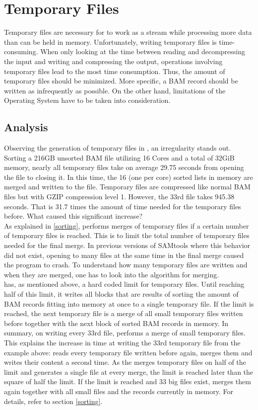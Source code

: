 \section{Temporary Files} 

Temporary files are necessary for \sort to work as a stream while processing more data than can be held in memory. Unfortunately, writing temporary files is time-consuming. When only looking at the time between reading and decompressing the input and writing and compressing the output, operations involving temporary files lead to the most time consumption. Thus, the amount of temporary files should be minimized. More specific, a BAM record should be written as infrequently as possible. On the other hand, limitations of the Operating System have to be taken into consideration.

\subsection{Analysis}
Observing the generation of temporary files in \sort, an irregularity stands out. Sorting a 216GB unsorted BAM file utilizing 16 Cores and a total of 32GiB memory, nearly all temporary files take on average 29.75 seconds from opening the file to closing it. In this time, the 16 (one per core) sorted lists in memory are merged and written to the file. Temporary files are compressed like normal BAM files but with GZIP compression level 1. However, the 33rd file takes 945.38 seconds. That is 31.7 times the amount of time needed for the temporary files before. What caused this significant increase? \\
As explained in \ref{sorting}, \sort performs merges of temporary files if a certain number of temporary files is reached. This is to limit the total number of temporary files needed for the final merge. In previous versions of SAMtools where this behavior did not exist, opening to many files at the same time in the final merge caused the program to crash.
To understand how many temporary files are written and when they are merged, one has to look into the algorithm for merging. \\
\sort has, as mentioned above, a hard coded limit for temporary files. Until reaching half of this limit, it writes all blocks that are results of sorting the amount of BAM records fitting into memory at once to a single temporary file. If the limit is reached, the next temporary file is a merge of all small temporary files written before together with the next block of sorted BAM records in memory. In summary, on writing every 33rd file, \sort performs a merge of small temporary files. This explains the increase in time at writing the 33rd temporary file from the example above: \sort reads every temporary file written before again, merges them and writes their content a second time. As the \sort merges temporary files on half of the limit and generates a single file at every merge, the limit is reached later than the square of half the limit. If the limit is reached and 33 big files exist, \sort merges them again together with all small files and the records currently in memory. For details, refer to section \ref{sorting}. \\
